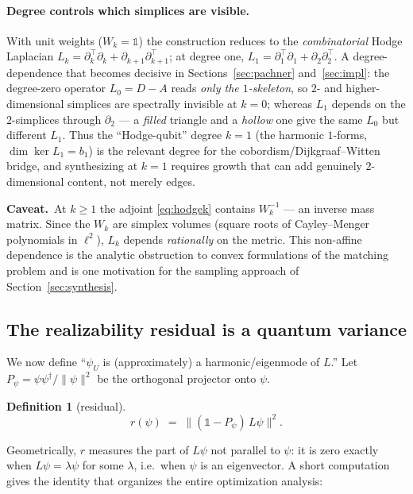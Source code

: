 \documentclass[11pt]{article}
\newcommand{\norm}[1]{\lVert #1 \rVert}
\newcommand{\bd}{\partial}
\theoremstyle{definition}
\newtheorem{definition}{Definition}[section]
\theoremstyle{plain}
\newcommand{\caveat}[1]{\par\noindent\textcolor{red!60!black}{\textbf{Caveat.}}\ #1\par}
\begin{document}
\paragraph{Degree controls which simplices are visible.}
With unit weights ($W_k=\mathbb{1}$) the construction reduces to the \emph{combinatorial}
Hodge Laplacian $L_k=\bd_k^{\top}\bd_k+\bd_{k+1}\bd_{k+1}^{\top}$; at degree one,
$L_1=\bd_1^{\top}\bd_1+\bd_2\bd_2^{\top}$. A degree-dependence that becomes decisive in
Sections~\ref{sec:pachner} and~\ref{sec:impl}: the degree-zero operator $L_0=D-A$ reads
\emph{only the $1$-skeleton}, so $2$- and higher-dimensional simplices are spectrally
invisible at $k=0$; whereas $L_1$ depends on the $2$-simplices through $\bd_2$ --- a
\emph{filled} triangle and a \emph{hollow} one give the same $L_0$ but different $L_1$. Thus
the ``Hodge-qubit'' degree $k=1$ (the harmonic $1$-forms, $\dim\ker L_1=b_1$) is the relevant
degree for the cobordism/Dijkgraaf--Witten bridge, and synthesizing at $k=1$ requires growth
that can add genuinely $2$-dimensional content, not merely edges.

\caveat{At $k\ge1$ the adjoint \eqref{eq:hodgek} contains $W_k^{-1}$ --- an inverse mass
matrix. Since the $W_k$ are simplex volumes (square roots of Cayley--Menger polynomials in
$\ell^2$), $L_k$ depends \emph{rationally} on the metric. This non-affine dependence is the
analytic obstruction to convex formulations of the matching problem and is one motivation
for the sampling approach of Section~\ref{sec:synthesis}.}

\subsection{The realizability residual is a quantum variance}
\label{sec:residual}

We now define ``$\psi_U$ is (approximately) a harmonic/eigenmode of $L$.'' Let $P_\psi =
\psi\psi^\dagger/\norm{\psi}^2$ be the orthogonal projector onto $\psi$.

\begin{definition}[residual]
\begin{equation}
r(\psi) \;=\; \norm{(\mathbb{1}-P_\psi)\,L\psi}^2 .
\label{eq:residual}
\end{equation}
\end{definition}

Geometrically, $r$ measures the part of $L\psi$ not parallel to $\psi$: it is zero exactly
when $L\psi=\lambda\psi$ for some $\lambda$, i.e.\ when $\psi$ is an eigenvector. A short
computation gives the identity that organizes the entire optimization analysis:
\end{document}
